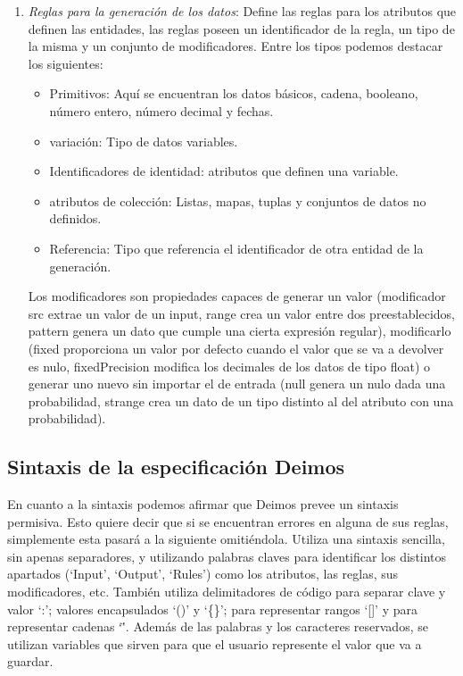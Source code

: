 \begin{enumerate}
	\item \emph{Reglas para la generación de los datos}: Define las reglas para los atributos que definen las entidades, las reglas poseen un identificador de la regla, un tipo de la misma y un conjunto de modificadores. Entre los tipos podemos destacar los siguientes:

	\begin{itemize}
		\item Primitivos: Aquí se encuentran los datos básicos, cadena, booleano, número entero, número decimal y fechas.
		\item variación: Tipo de datos variables.
		\item Identificadores de identidad: atributos que definen una variable.
		\item atributos de colección: Listas, mapas, tuplas y conjuntos de datos no definidos.
		\item Referencia: Tipo que referencia el identificador de otra entidad de la generación.
	\end{itemize}

	Los modificadores son propiedades capaces de generar un valor (modificador src extrae un valor de un input, range crea un valor entre dos preestablecidos, pattern genera un dato que cumple una cierta expresión regular), modificarlo (fixed proporciona un valor por defecto cuando el valor que se va a devolver es nulo, fixedPrecision modifica los decimales de los datos de tipo float) o generar uno nuevo sin importar el de entrada (null genera un nulo dada una probabilidad, strange crea un dato de un tipo distinto al del atributo con una probabilidad).
\end{enumerate}


\subsection{Sintaxis de la especificación Deimos\label{03Deimos}}

En cuanto a la sintaxis podemos afirmar que Deimos prevee un sintaxis permisiva. Esto quiere decir que si se encuentran errores en alguna de sus reglas, simplemente esta pasará a la siguiente omitiéndola. Utiliza una sintaxis sencilla, sin apenas separadores, y utilizando palabras claves para identificar los distintos apartados (`Input', `Output', `Rules') como los atributos, las reglas, sus modificadores, etc. También utiliza delimitadores de código para separar clave y valor `:'; valores encapsulados `()' y `\{\}'; para representar rangos `[]' y para representar cadenas `\"'. Además de las palabras y los caracteres reservados, se utilizan variables que sirven para que el usuario represente el valor que va a guardar.

